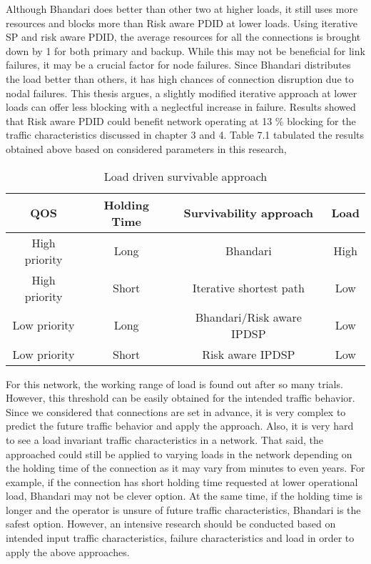
\noindent 

Although Bhandari does better than other two at higher loads, it still uses more resources and blocks more than Risk aware PDID at lower loads. Using iterative SP and risk aware PDID, the average resources for all the connections is brought down by 1 for both primary and backup. While this may not be beneficial for link failures, it may be a crucial factor for node failures. Since Bhandari distributes the load better than others, it has high chances of connection disruption due to nodal failures. This thesis argues, a slightly modified iterative approach at lower loads can offer less blocking with a neglectful increase in failure. Results showed that Risk aware PDID could benefit network operating at 13 \% blocking for the traffic characteristics discussed in chapter 3 and 4. Table 7.1 tabulated the results obtained above based on considered parameters in this research,


\begin{table}
\centering
\caption{Load driven survivable approach}
 	\begin{tabular}{|c|c|c|c|}
	\hline\hline
	\textbf{QOS} & \textbf{Holding Time} & \textbf{Survivability approach} & \textbf{Load}\\
	\hline
	High priority & Long & Bhandari & High\\
	High priority& Short&Iterative shortest path&Low\\
	Low priority&Long&Bhandari/Risk aware IPDSP&Low\\
	Low priority&Short&Risk aware IPDSP&Low\\
	\hline
	\end{tabular}
\end{table}

For this network, the working range of load is found out after so many trials. However, this threshold can be easily obtained for the intended traffic behavior. Since we considered that connections are set in advance, it is very complex to predict the future traffic behavior and apply the approach. Also, it is very hard to see a load invariant traffic characteristics in a network. That said, the approached could still be applied to varying loads in the network depending on the holding time of the connection as it may vary from minutes to even years. For example, if the connection has short holding time requested at lower operational load, Bhandari may not be clever option. At the same time, if the holding time is longer and the operator is unsure of future traffic characteristics, Bhandari is the safest option. However, an intensive research should be conducted based on intended input traffic characteristics, failure characteristics and load in order to apply the above approaches.  